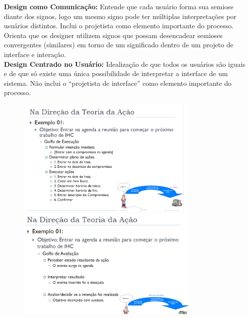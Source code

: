 \documentclass[9pt, twocolumn, article]{memoir}
\begin{document}
\textbf{Design como Comunicação: } Entende que cada usuário forma
sua semiose diante dos signos, logo um mesmo signo pode ter múltiplas interpretações por usuários distintos. Inclui o projetista como elemento importante do processo. Orienta que os designer utilizem signos que possam desencadear semioses convergentes (similares) em torno de um significado dentro de um projeto de interface e interação.\\
\textbf{Design Centrado no Usuário: } Idealização de que todos os
usuários são iguais e de que só existe uma única possibilidade de
interpretar a interface de um sistema. Não inclui o “projetista de
interface” como elemento importante do processo.



\centering
\begin{figure}
\includegraphics[width = 0.8\textwidth]{1.png}\\

\includegraphics[width = 0.8\textwidth]{2.png}\\
\end{figure}
\end{document}
